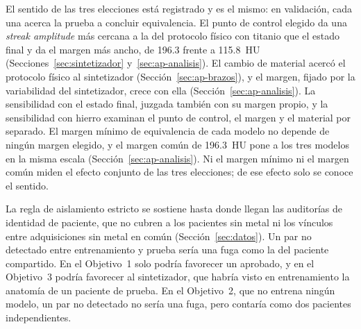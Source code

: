 El sentido de las tres elecciones está registrado y es el mismo: en validación, cada una acerca la prueba a concluir equivalencia. El punto de control elegido da una \emph{streak amplitude} más cercana a la del protocolo físico con titanio que el estado final y da el margen más ancho, de 196.3 frente a 115.8~HU (Secciones~\ref{sec:sintetizador} y~\ref{sec:ap-analisis}). El cambio de material acercó el protocolo físico al sintetizador (Sección~\ref{sec:ap-brazos}), y el margen, fijado por la variabilidad del sintetizador, crece con ella (Sección~\ref{sec:ap-analisis}). La sensibilidad con el estado final, juzgada también con su margen propio, y la sensibilidad con hierro examinan el punto de control, el margen y el material por separado. El margen mínimo de equivalencia de cada modelo no depende de ningún margen elegido, y el margen común de 196.3~HU pone a los tres modelos en la misma escala (Sección~\ref{sec:ap-analisis}). Ni el margen mínimo ni el margen común miden el efecto conjunto de las tres elecciones; de ese efecto solo se conoce el sentido.

La regla de aislamiento estricto se sostiene hasta donde llegan las auditorías de identidad de paciente, que no cubren a los pacientes sin metal ni los vínculos entre adquisiciones sin metal en común (Sección~\ref{sec:datos}). Un par no detectado entre entrenamiento y prueba sería una fuga como la del paciente compartido. En el Objetivo~1 solo podría favorecer un aprobado, y en el Objetivo~3 podría favorecer al sintetizador, que habría visto en entrenamiento la anatomía de un paciente de prueba. En el Objetivo~2, que no entrena ningún modelo, un par no detectado no sería una fuga, pero contaría como dos pacientes independientes.



